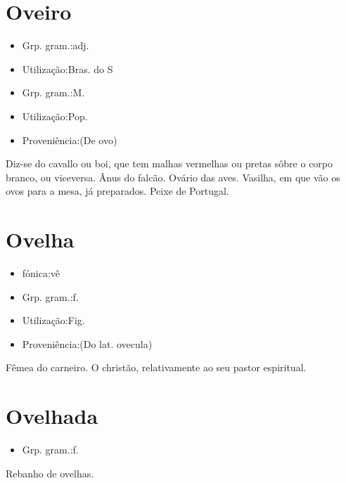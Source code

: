\section{Oveiro}
\begin{itemize}
\item {Grp. gram.:adj.}
\end{itemize}
\begin{itemize}
\item {Utilização:Bras. do S}
\end{itemize}
\begin{itemize}
\item {Grp. gram.:M.}
\end{itemize}
\begin{itemize}
\item {Utilização:Pop.}
\end{itemize}
\begin{itemize}
\item {Proveniência:(De \textunderscore ovo\textunderscore )}
\end{itemize}
Diz-se do cavallo ou boi, que tem malhas vermelhas ou pretas sôbre o corpo branco, ou viceversa.
Ânus do falcão.
Ovário das aves.
Vasilha, em que vão os ovos para a mesa, já preparados.
Peixe de Portugal.
\section{Ovelha}
\begin{itemize}
\item {fónica:vê}
\end{itemize}
\begin{itemize}
\item {Grp. gram.:f.}
\end{itemize}
\begin{itemize}
\item {Utilização:Fig.}
\end{itemize}
\begin{itemize}
\item {Proveniência:(Do lat. \textunderscore ovecula\textunderscore )}
\end{itemize}
Fêmea do carneiro.
O christão, relativamente ao seu pastor espiritual.
\section{Ovelhada}
\begin{itemize}
\item {Grp. gram.:f.}
\end{itemize}
Rebanho de ovelhas.
